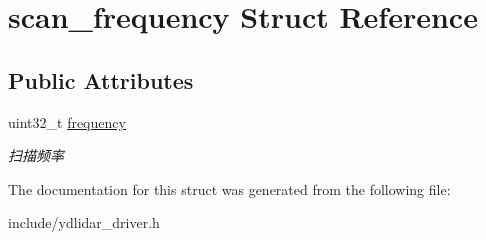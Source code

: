 \hypertarget{structscan__frequency}{}\section{scan\+\_\+frequency Struct Reference}
\label{structscan__frequency}
\subsection*{Public Attributes}
\begin{DoxyCompactItemize}
\item 
uint32\+\_\+t \hyperlink{structscan__frequency_ae4f2152e77416cff02f44452355f2808}{frequency}\hypertarget{structscan__frequency_ae4f2152e77416cff02f44452355f2808}{}\label{structscan__frequency_ae4f2152e77416cff02f44452355f2808}

\begin{DoxyCompactList}\small\item\em 扫描频率 \end{DoxyCompactList}\end{DoxyCompactItemize}


The documentation for this struct was generated from the following file\+:\begin{DoxyCompactItemize}
\item 
include/ydlidar\+\_\+driver.\+h\end{DoxyCompactItemize}
